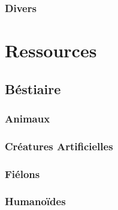 \documentclass{dd}
\begin{document}
\section{Divers}



\part{Ressources}

\chapter{Béstiaire}

\section{Animaux}



\section{Créatures Artificielles}









\section{Fiélons}










\section{Humanoïdes}










\end{document}

